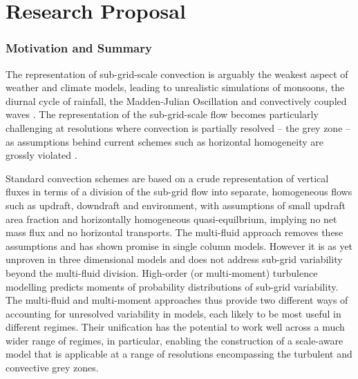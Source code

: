\documentclass[11pt,a4paper]{article}
\begin{document}


\newpage

\part{Research Proposal}

\section{Motivation and Summary}

The representation of sub-grid-scale convection is arguably the weakest aspect of weather and climate models, leading to unrealistic simulations of monsoons, the diurnal cycle of rainfall, the Madden-Julian Oscillation and convectively coupled waves  \cite[]{SAB+13,HPB+14}. The representation of the sub-grid-scale flow becomes particularly challenging at resolutions where convection is partially resolved -- the grey zone -- as assumptions behind current schemes such as horizontal homogeneity are grossly violated \cite[e.g.][]{GG05}.

Standard convection schemes are based on a crude representation of vertical fluxes in terms of a division of the sub-grid flow into separate, homogeneous flows such as updraft, downdraft and environment, with assumptions of small updraft area fraction and horizontally homogeneous quasi-equilbrium, implying no net mass flux and no horizontal transports. The multi-fluid approach removes these assumptions and has shown promise in single column models. However it is as yet unproven in three dimensional models and does not address sub-grid variability beyond the multi-fluid division. High-order (or multi-moment) turbulence modelling predicts moments of probability distributions of sub-grid variability. The multi-fluid and multi-moment approaches thus provide two different ways of accounting for unresolved variability in models, each likely to be most useful in different regimes. Their unification has the potential to work well across a much wider range of regimes, in particular, enabling the construction of a scale-aware model that is applicable at a range of resolutions encompassing the turbulent and convective grey zones.
\end{document}
